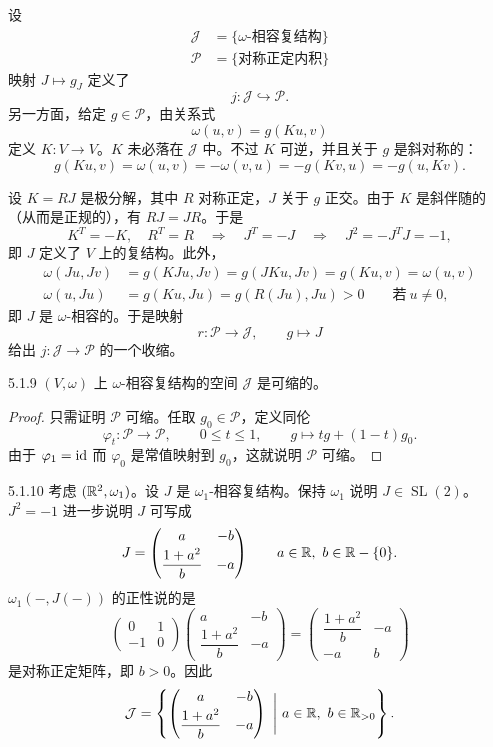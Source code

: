 设
\begin{align*}
\mathcal{J}&=\{\omega\text{-相容复结构}\}\\
\mathcal{P}&=\{\text{对称正定内积}\}
\end{align*}
映射 $J\mapsto g_J$ 定义了
\[
j:\mathcal{J}\hookrightarrow\mathcal{P}.
\]
另一方面，给定 $g\in\mathcal{P}$，由关系式
\[
\omega(u,v)=g(Ku,v)
\]
定义 $K:V\to V$。$K$ 未必落在 $\mathcal{J}$ 中。不过 $K$ 可逆，并且关于 $g$ 是斜对称的：
\[
g(Ku,v)=\omega(u,v)=-\omega(v,u)=-g(Kv,u)=-g(u,Kv).
\]


设 $K=RJ$ 是极分解，其中 $R$ 对称正定，$J$ 关于 $g$ 正交。由于 $K$ 是斜伴随的（从而是正规的），有 $RJ=JR$。于是
\[
K^T=-K,\quad R^T=R\quad\Longrightarrow\quad J^T=-J\quad\Longrightarrow\quad J^2=-J^TJ=-1,
\]
即 $J$ 定义了 $V$ 上的复结构。此外，
\begin{align*}
\omega(Ju,Jv)&=g(KJu,Jv)=g(JKu,Jv)=g(Ku,v)=\omega(u,v)\\
\omega(u,Ju)&=g(Ku,Ju)=g(R(Ju),Ju)>0\qquad\text{若}\ u\neq 0,
\end{align*}
即 $J$ 是 $\omega$-相容的。于是映射
\[
r:\mathcal{P}\longrightarrow\mathcal{J},\qquad g\longmapsto J
\]
给出 $j:\mathcal{J}\to\mathcal{P}$ 的一个收缩。

\begin{proposition}{5.1.9}
$(V,\omega)$ 上 $\omega$-相容复结构的空间 $\mathcal{J}$ 是可缩的。
\end{proposition}

\begin{proof}
只需证明 $\mathcal{P}$ 可缩。任取 $g_0\in\mathcal{P}$，定义同伦
\[
\varphi_t:\mathcal{P}\longrightarrow\mathcal{P},\qquad 0\le t\le 1,\qquad g\longmapsto tg+(1-t)g_0.
\]
由于 $\varphi_1=\mathrm{id}$ 而 $\varphi_0$ 是常值映射到 $g_0$，这就说明 $\mathcal{P}$ 可缩。
\end{proof}

\begin{example}{5.1.10}
考虑 $(\mathbb{R}^2,\omega_1)$。设 $J$ 是 $\omega_1$-相容复结构。保持 $\omega_1$ 说明 $J\in\operatorname{SL}(2)$。$J^2=-1$ 进一步说明 $J$ 可写成
\[
J=\begin{pmatrix}a&-b\\[2pt]\dfrac{1+a^2}{b}&-a\end{pmatrix}\qquad a\in\mathbb{R},\ b\in\mathbb{R}-\{0\}.
\]
$\omega_1(-,J(-))$ 的正性说的是
\[
\begin{pmatrix}0&1\\-1&0\end{pmatrix}
\begin{pmatrix}a&-b\\[2pt]\dfrac{1+a^2}{b}&-a\end{pmatrix}
=\begin{pmatrix}\dfrac{1+a^2}{b}&-a\\[2pt]-a&b\end{pmatrix}
\]
是对称正定矩阵，即 $b>0$。因此
\[
\mathcal{J}=\left\{\begin{pmatrix}a&-b\\[2pt]\dfrac{1+a^2}{b}&-a\end{pmatrix}\ \Bigg|\ a\in\R,\ b\in\R_{>0}\right\}.
\]
\end{example}

